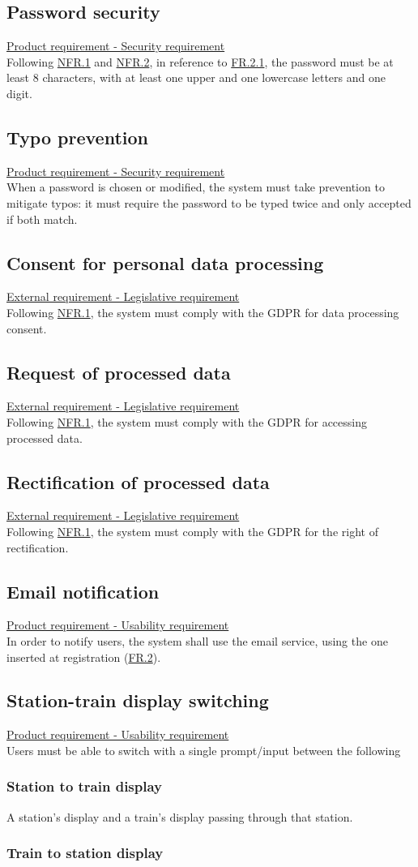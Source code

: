 \documentclass[12pt]{article}
\newcommand\un[1]{\underline{#1}}
\newcommand\hyl[1]{\hyperref[#1]{#1}}
\newcommand\subs[2]{\subsection{#1}\label{#2}}
\newcommand\ssubs[2]{\subsubsection{#1}\label{#2}}
\begin{document}
\subs{Password security}{NFR.4}
\un{Product requirement - Security requirement} \\

\noindent Following \hyl{NFR.1} and \hyl{NFR.2}, in reference to \hyl{FR.2.1}, the password must be at least 8 characters, 
with at least one upper and one lowercase letters and one digit.

\subs{Typo prevention}{NFR.5}
\un{Product requirement - Security requirement} \\

\noindent When a password is chosen or modified, the system must take prevention to mitigate typos: it must require the password to be typed twice and only accepted if both match.

\subs{Consent for personal data processing}{NFR.6}
\un{External requirement - Legislative requirement} \\

\noindent Following \hyl{NFR.1}, the system must comply with the GDPR for data processing consent.

\subs{Request of processed data}{NFR.7}
\un{External requirement - Legislative requirement} \\

\noindent Following \hyl{NFR.1}, the system must comply with the GDPR for accessing processed data.

\subs{Rectification of processed data}{NFR.8}
\un{External requirement - Legislative requirement} \\

\noindent Following \hyl{NFR.1}, the system must comply with the GDPR for the right of rectification.

\subs{Email notification}{NFR.9}
\un{Product requirement - Usability requirement} \\

\noindent In order to notify users, the system shall use the email service, using the one inserted at registration (\hyl{FR.2}).

\subs{Station-train display switching}{NFR.10}
\un{Product requirement - Usability requirement} \\
Users must be able to switch with a single prompt/input between the following

\ssubs{Station to train display}{NFR.10.1}

\noindent A station's display and a train's display passing 
through that station.

\ssubs{Train to station display}{NFR.10.2}
\end{document}
